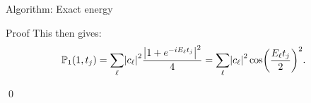 \documentclass[a4paper]{article}
\begin{document}
\begin{parag}{Algorithm: Exact energy}
\begin{subparag}{Proof}
        This then gives:
        \[\prob_1\left(1, t_j\right) = \sum_{\ell} \left|c_{\ell}\right|^2 \frac{\left|1 + e^{-i E_{\ell} t_j}\right|^2}{4} = \sum_{\ell} \left|c_{\ell}\right|^2 \cos\left(\frac{E_{\ell}t_j}{2}\right)^2.\]
        
        \qed
    \end{subparag}
\end{parag}
\end{document}
